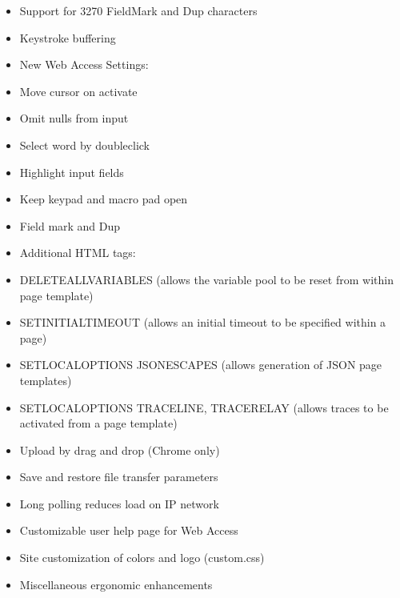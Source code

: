 \documentclass[letterpaper,10pt,english]{sphinxmanual}
\begin{document}
\sphinxAtStartPar
{}
\begin{itemize}
\item {} 
\sphinxAtStartPar
Support for 3270 FieldMark and Dup characters

\item {} 
\sphinxAtStartPar
Keystroke buffering

\item {} 
\sphinxAtStartPar
New Web Access Settings:

\item {} 
\sphinxAtStartPar
Move cursor on activate

\item {} 
\sphinxAtStartPar
Omit nulls from input

\item {} 
\sphinxAtStartPar
Select word by double\sphinxhyphen{}click

\item {} 
\sphinxAtStartPar
Highlight input fields

\item {} 
\sphinxAtStartPar
Keep keypad and macro pad open

\item {} 
\sphinxAtStartPar
Field mark and Dup

\item {} 
\sphinxAtStartPar
Additional HTML tags:

\item {} 
\sphinxAtStartPar
DELETE\sphinxhyphen{}ALL\sphinxhyphen{}VARIABLES (allows the variable pool to be reset from within page template)

\item {} 
\sphinxAtStartPar
SET\sphinxhyphen{}INITIAL\sphinxhyphen{}TIMEOUT (allows an initial timeout to be specified within a page)

\item {} 
\sphinxAtStartPar
SET\sphinxhyphen{}LOCAL\sphinxhyphen{}OPTIONS JSON\sphinxhyphen{}ESCAPES (allows generation of JSON page templates)

\item {} 
\sphinxAtStartPar
SET\sphinxhyphen{}LOCAL\sphinxhyphen{}OPTIONS TRACE\sphinxhyphen{}LINE, TRACE\sphinxhyphen{}RELAY (allows traces to be activated from a page template)

\item {} 
\sphinxAtStartPar
Upload by drag and drop (Chrome only)

\item {} 
\sphinxAtStartPar
Save and restore file transfer parameters

\item {} 
\sphinxAtStartPar
Long polling reduces load on IP network

\item {} 
\sphinxAtStartPar
Customizable user help page for Web Access

\item {} 
\sphinxAtStartPar
Site customization of colors and logo (custom.css)

\item {} 
\sphinxAtStartPar
Miscellaneous ergonomic enhancements

\end{itemize}
\end{document}
